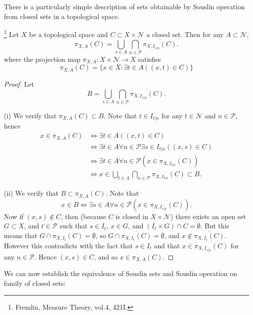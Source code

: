 There is a particularly simple description of sets obtainable by Souslin
operation from closed sets in a topological space.
\begin{lemma} \label{souslin_close}
\footnote{Fremlin, Measure Theory, vol.4, 421I.}
Let $X$ be a topological space and $C\subset X\times\mathcal{N}$ a closed set.
Then for any $A\subset\mathcal{N}$,
\[
  \pi_{X,A}(C) = \bigcup_{s\in A} \bigcap_{n\in\mathcal{P}}
             \overline{ \pi_{X,I_{s|n}}(C) }.
\]
where the projection map $\pi_{X,A}:X\times \mathcal{N}\to X$ satisfies
\[
  \pi_{X,A}(C) = \{ x\in X: \exists t\in A ((x,t)\in C)  \}
\]
\end{lemma}
\begin{proof}
Let 
\[
  B = \bigcup_{s\in A} \bigcap_{n\in\mathcal{P}} \overline{ \pi_{X,I_{s|n}}(C) }.
\]

(i) We verify that $\pi_{X,A}(C)\subset B$. Note that $t\in I_{t|n}$ for any
$t\in\mathcal{N}$ and $n\in\mathcal{P}$, hence
\begin{align*}
  x\in\pi_{X,A}(C)
    & \iff \exists t\in A ((x,t)\in C)  \\
    & \iff \exists t\in A \forall n\in\mathcal{P} \exists s\in I_{t|n} ((x,s)\in C)  \\
    & \iff \exists t\in A \forall n\in\mathcal{P} (x\in \pi_{X,I_{t|n}}(C))  \\
    & \iff x\in \bigcup_{t\in A} \bigcap_{n\in\mathcal{P}} \pi_{X,I_{t|n}}(C)
	  \subset B.
\end{align*}

(ii) We verify that $B\subset\pi_{X,A}(C)$. Note that
\[
  x\in B \iff \exists s\in A \forall n\in\mathcal{P} ( x\in \overline{\pi_{X,I_{s|n}}(C)} ).
\]
Now if $(x,s)\notin C$, then (because $C$ is closed in $X\times \mathcal{N}$)
there exists an open set $G\subset X$, and $t\in \mathcal{P}$ such that 
$s\in I_t$, $x\in G$, and $(I_t\times G)\cap C=\emptyset$.
But this means that $G\cap \pi_{X,I_t}(C)=\emptyset$, 
so $G\cap \overline{\pi_{X,I_t}(C)} =\emptyset$, and $x\notin \overline{\pi_{X,I_t}(C)}$.
However this contradicts with the fact that $s\in I_t$ and that 
$x\in \overline{\pi_{X,I_{s|n}}(C)}$ for any $n\in\mathcal{P}$.
Hence $(x,s)\in C$, and so $x\in \pi_{X,A}(C)$.
\end{proof}

We can now establish the equivalence of Souslin sets and Souslin operation on
family of closed sets:

